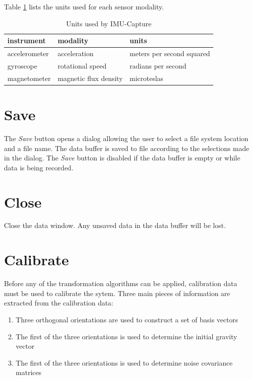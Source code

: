 \documentclass[11pt,letterpaper,article,oneside]{memoir}
\newcommand{\name}{IMU-Capture}
\begin{document}
Table \ref{tab:units} lists the units used for each sensor modality.

\begin{table}
\centering
\begin{tabular}{@{}*3l@{}}
\toprule
instrument & modality & units \\
\midrule 
accelerometer & acceleration          & meters per second squared \\
gyroscope     & rotational speed      & radians per second\\
magnetometer  & magnetic flux density & microteslas \\
\bottomrule
\end{tabular}
\caption{Units used by \name{}}
\label{tab:units}
\end{table}


\section{Save}

The \emph{Save} button opens a dialog allowing the user to select a file system
location and a file name.  The data buffer is saved to file according to the
selections made in the dialog. The \emph{Save} button is disabled if the data
buffer is empty or while data is being recorded.

\section{Close}

Close the data window. Any unsaved data in the data buffer will be lost.



\section{Calibrate}

Before any of the transformation algorithms can be applied, calibration data
must be used to calibrate the sytem.  Three main pieces of information are
extracted from the calibration data:

\begin{enumerate}
\item Three orthogonal orientations are used to construct a set of basis vectors
\item The first of the three orientations is used to determine the initial gravity vector
\item The first of the three orientations is used to determine noise covariance matrices
\end{enumerate}
\end{document}
